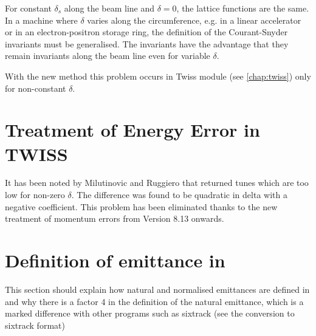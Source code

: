 For constant $\delta_s$ along the beam line and $\delta = 0$, the
lattice functions are the same. In a machine where $\delta$ varies along
the circumference, e.g. in a linear accelerator or in an
electron-positron storage ring, the definition of the Courant-Snyder
invariants must be generalised. The \madeight invariants have the advantage
that they remain invariants along the beam line even for variable $\delta$.  

With the new method this problem occurs in Twiss module (see
\ref{chap:twiss}) only for non-constant $\delta$.    

\section{Treatment of Energy Error in TWISS} 
It has been noted by Milutinovic and Ruggiero \cite{milutinovic1988}
that \madeight returned tunes which are too low for non-zero
$\delta$. The difference was found to be quadratic in delta with a negative
coefficient. This problem has been eliminated thanks to the new
treatment  of momentum errors from \madeight Version 8.13 onwards.   

\section{Definition of emittance in \madx}
This section should explain how natural and normalised emittances are
defined in \madx and why there is a factor 4 in the definition of the
natural emittance, which is a marked difference with other programs such
as sixtrack (see the conversion to sixtrack format)


